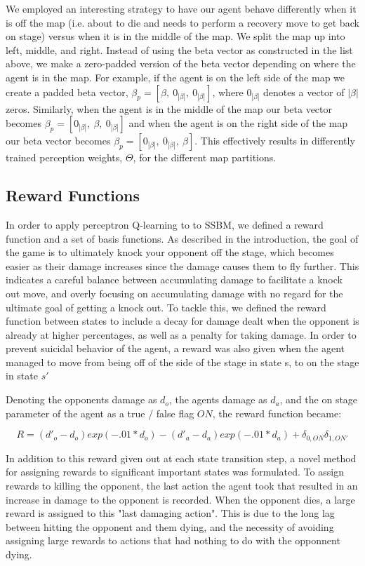 We employed an interesting strategy to have our agent behave differently when it is off the map (i.e. about to die and needs to perform a recovery move to get back on stage) versus when it is in the middle of the map. We split the map up into left, middle, and right. Instead of using the beta vector as constructed in the list above, we make a zero-padded version of the beta vector depending on where the agent is in the map. For example, if the agent is on the left side of the map we create a padded beta vector, $\beta_{p} = [\beta,~0_{|\beta|},~0_{|\beta|}]$, where $0_{|\beta|}$ denotes a vector of $|\beta|$ zeros. Similarly, when the agent is in the middle of the map our beta vector becomes $\beta_{p} = [0_{|\beta|},~\beta,~0_{|\beta|}]$ and when the agent is on the right side of the map our beta vector becomes $\beta_{p} = [0_{|\beta|},~0_{|\beta|},~\beta]$. This effectively results in differently trained perception weights, $\Theta$, for the different map partitions.

\subsection{Reward Functions}

In order to apply perceptron Q-learning to to SSBM, we defined a reward function and a set of basis functions. As described in the introduction, the goal of the game is to ultimately knock your opponent off the stage, which becomes easier as their damage increases since the damage causes them to fly further. This indicates a careful balance between accumulating damage to facilitate a knock out move, and overly focusing on accumulating damage with no regard for the ultimate goal of getting a knock out. To tackle this, we defined the reward function between states to include a decay for damage dealt when the opponent is already at higher percentages, as well as a penalty for taking damage. In order to prevent suicidal behavior of the agent, a reward was also given when the agent managed to move from being off of the side of the stage in state s, to on the stage in state $s'$

Denoting the opponents damage as $d_o$, the agents damage as $d_a$, and the on stage parameter of the agent as a true / false flag $ON$, the reward function became:

$$R = (d'_o-d_o)exp(-.01*d_o) - (d'_a-d_a)exp(-.01*d_a) + \delta_{0,ON}\delta_{1,ON'}$$

In addition to this reward given out at each state transition step, a novel method for assigning rewards to significant important states was formulated. To assign rewards to killing the opponent, the last action the agent took that resulted in an increase in damage to the opponent is recorded. When the opponent dies, a large reward is assigned to this "last damaging action". This is due to the long lag between hitting the opponent and them dying, and the necessity of avoiding assigning large rewards to actions that had nothing to do with the opponnent dying. 

